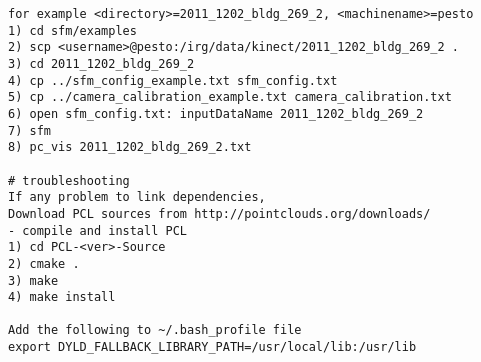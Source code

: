 \documentclass[12pt]{article}
\begin{document}
\begin{lstlisting}
for example <directory>=2011_1202_bldg_269_2, <machinename>=pesto
1) cd sfm/examples
2) scp <username>@pesto:/irg/data/kinect/2011_1202_bldg_269_2 .
3) cd 2011_1202_bldg_269_2
4) cp ../sfm_config_example.txt sfm_config.txt
5) cp ../camera_calibration_example.txt camera_calibration.txt
6) open sfm_config.txt: inputDataName 2011_1202_bldg_269_2
7) sfm
8) pc_vis 2011_1202_bldg_269_2.txt

# troubleshooting
If any problem to link dependencies,
Download PCL sources from http://pointclouds.org/downloads/ 
- compile and install PCL
1) cd PCL-<ver>-Source
2) cmake .
3) make
4) make install

Add the following to ~/.bash_profile file
export DYLD_FALLBACK_LIBRARY_PATH=/usr/local/lib:/usr/lib
\end{lstlisting}
\end{document}
